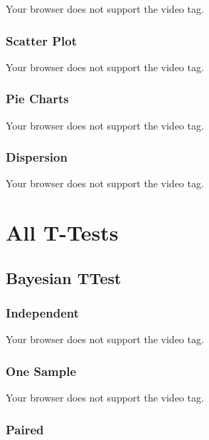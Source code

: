 \documentclass[
  letterpaper,
  DIV=11,
  numbers=noendperiod]{scrreprt}
\begin{document}
Your browser does not support the video tag.

\hypertarget{scatter-plot}{%
\subsection{Scatter Plot}\label{scatter-plot}}

Your browser does not support the video tag.

\hypertarget{pie-charts}{%
\subsection{Pie Charts}\label{pie-charts}}

Your browser does not support the video tag.

\hypertarget{dispersion}{%
\subsection{Dispersion}\label{dispersion}}

Your browser does not support the video tag.


\hypertarget{all-t-tests}{%
\chapter{All T-Tests}\label{all-t-tests}}

\hypertarget{bayesian-ttest}{%
\section{Bayesian TTest}\label{bayesian-ttest}}

\hypertarget{independent}{%
\subsection{Independent}\label{independent}}

Your browser does not support the video tag.

\hypertarget{one-sample}{%
\subsection{One Sample}\label{one-sample}}

Your browser does not support the video tag.

\hypertarget{paired}{%
\subsection{Paired}\label{paired}}
\end{document}
